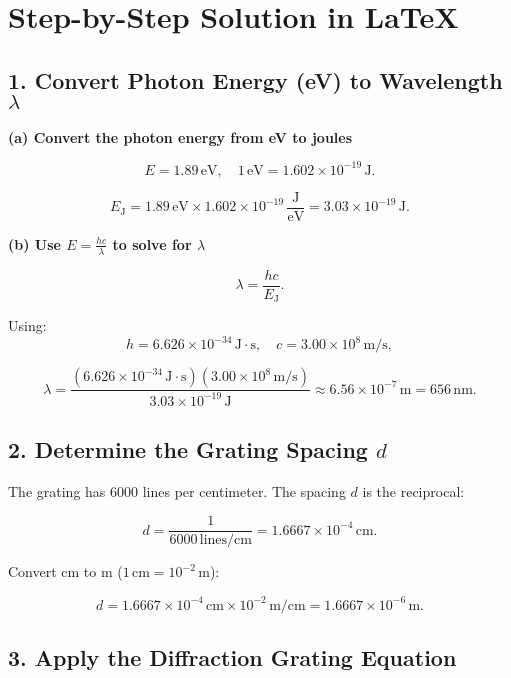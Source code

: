 \documentclass[12pt]{article}
\title{}
\author{Jerich Lee}
\date{\today}
\theoremstyle{definition} %
\theoremstyle{plain} %
\begin{document}
\maketitle
\section*{Step-by-Step Solution in \LaTeX{}}

\subsection*{1. Convert Photon Energy (eV) to Wavelength \(\lambda\)}

\textbf{(a) Convert the photon energy from eV to joules}

\[
E = 1.89 \,\text{eV}, \quad
1 \,\text{eV} = 1.602 \times 10^{-19} \,\text{J}.
\]

\[
E_{\text{J}} = 1.89 \,\text{eV} \times 1.602 \times 10^{-19} \,\frac{\text{J}}{\text{eV}}
= 3.03 \times 10^{-19} \,\text{J}.
\]

\textbf{(b) Use \(\displaystyle E = \frac{hc}{\lambda}\) to solve for \(\lambda\)}

\[
\lambda = \frac{hc}{E_{\text{J}}}.
\]

Using:
\[
h = 6.626 \times 10^{-34}\,\text{J}\cdot\text{s}, 
\quad
c = 3.00 \times 10^{8}\,\text{m/s},
\]

\[
\lambda 
= \frac{(6.626 \times 10^{-34}\,\text{J}\cdot\text{s})(3.00 \times 10^{8}\,\text{m/s})}{3.03 \times 10^{-19}\,\text{J}}
\approx 6.56 \times 10^{-7}\,\text{m}
= 656\,\text{nm}.
\]

\subsection*{2. Determine the Grating Spacing \(d\)}

The grating has \(6000\) lines per centimeter. The spacing \(d\) is the reciprocal:

\[
d = \frac{1}{6000 \,\text{lines/cm}} = 1.6667 \times 10^{-4} \,\text{cm}.
\]

Convert cm to m (\(1\,\text{cm} = 10^{-2}\,\text{m}\)):

\[
d = 1.6667 \times 10^{-4} \,\text{cm} \times 10^{-2}\,\text{m/cm} 
= 1.6667 \times 10^{-6} \,\text{m}.
\]

\subsection*{3. Apply the Diffraction Grating Equation}
\end{document}
